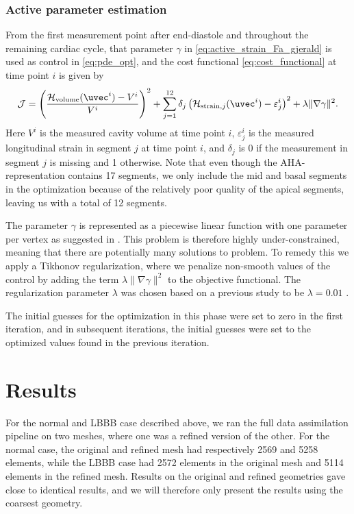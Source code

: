\subsubsection{Active parameter estimation}
\label{sec:active_param_estim}
From the first measurement point after end-diastole and throughout the
remaining cardiac cycle, that parameter $\gamma$ in
\eqref{eq:active_strain_Fa_gjerald} is used as control in
\eqref{eq:pde_opt}, and the cost functional \eqref{eq:cost_functional}
at time point $i$ is given by 
\begin{align}
  \mathcal{J} =
   \left(\frac{\mathcal{H}_{\mathrm{volume}}(\uvec^i)
  - V^i}{V^i} \right)^2 +
  \sum_{j=1}^{12} \delta_j \left( \mathcal{H}_{\mathrm{strain}, j}(\uvec^i)
  - \varepsilon_{j}^i \right)^2  + \lambda \| \nabla \gamma \|^2.
\end{align}
Here $V^i$ is the measured cavity volume at time point $i$, 
$\varepsilon_{j}^i$ is the measured longitudinal strain in segment $j$
at time point $i$, and $\delta_j$ is 0 if the measurement in segment
$j$ is missing and 1 otherwise. Note that even though the  
AHA-representation \cite{cerqueira2002standardized} contains 17
segments, we only include the mid and basal segments in the
optimization because of the relatively poor quality of the apical
segments, leaving us with a total of 12 segments.

The parameter $\gamma$ is represented as a piecewise linear function
with one parameter per vertex as suggested in \cite{balaban2017high}.
This problem is therefore highly under-constrained, meaning that there
are potentially many solutions to problem. To remedy this we apply a
Tikhonov regularization, where we penalize non-smooth values of the
control by adding the term $\lambda \| \nabla \gamma \|^2$ to the
objective functional. The regularization parameter $\lambda$
was chosen based on a previous study to be $\lambda=0.01$ \cite{balaban2017high}.

The initial guesses for the optimization in this phase were set to
zero in the first iteration, and in subsequent iterations, the initial
guesses were set to the optimized values found in the previous iteration.

\section{Results}
For the normal and LBBB case described above, we ran the
full data assimilation pipeline on two meshes, where one was a refined version of the
other. For the normal case, the original and refined mesh had
respectively 2569 and 5258 elements, while the LBBB case
had 2572 elements in the original mesh and 5114 elements in the
refined mesh. Results on the original and refined geometries gave
close to identical results, and we will therefore only present the
results using the coarsest geometry. 


